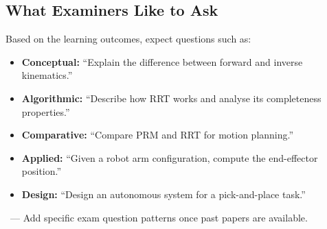 \bigseparator

\subsection*{What Examiners Like to Ask}

Based on the learning outcomes, expect questions such as:
\begin{itemize}
  \item \textbf{Conceptual:} ``Explain the difference between forward and inverse kinematics.''
  \item \textbf{Algorithmic:} ``Describe how RRT works and analyse its completeness properties.''
  \item \textbf{Comparative:} ``Compare PRM and RRT for motion planning.''
  \item \textbf{Applied:} ``Given a robot arm configuration, compute the end-effector position.''
  \item \textbf{Design:} ``Design an autonomous system for a pick-and-place task.''
\end{itemize}

\TODO\ --- Add specific exam question patterns once past papers are available.
